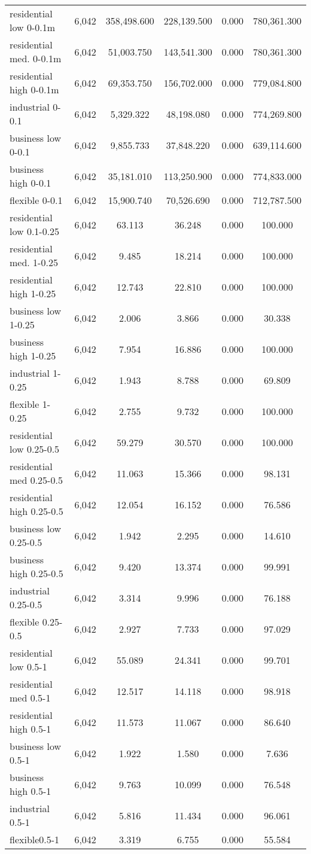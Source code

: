 \begin{table}[!htbp]
\begin{tabular}{@{\extracolsep{5pt}}lccccc}
residential low 0-0.1m & 6,042 & 358,498.600 & 228,139.500 & 0.000 & 780,361.300 \\ 
residential med. 0-0.1m& 6,042 & 51,003.750 & 143,541.300 & 0.000 & 780,361.300 \\ 
residential high 0-0.1m& 6,042 & 69,353.750 & 156,702.000 & 0.000 & 779,084.800 \\ 
industrial 0-0.1& 6,042 & 5,329.322 & 48,198.080 & 0.000 & 774,269.800 \\ 
business low 0-0.1& 6,042 & 9,855.733 & 37,848.220 & 0.000 & 639,114.600 \\ 
business high 0-0.1& 6,042 & 35,181.010 & 113,250.900 & 0.000 & 774,833.000 \\ 
flexible 0-0.1& 6,042 & 15,900.740 & 70,526.690 & 0.000 & 712,787.500 \\ 
residential low 0.1-0.25& 6,042 & 63.113 & 36.248 & 0.000 & 100.000 \\ 
residential med. 1-0.25& 6,042 & 9.485 & 18.214 & 0.000 & 100.000 \\ 
residential high 1-0.25& 6,042 & 12.743 & 22.810 & 0.000 & 100.000 \\ 
business low 1-0.25& 6,042 & 2.006 & 3.866 & 0.000 & 30.338 \\ 
business high 1-0.25& 6,042 & 7.954 & 16.886 & 0.000 & 100.000 \\ 
industrial  1-0.25& 6,042 & 1.943 & 8.788 & 0.000 & 69.809 \\ 
flexible 1-0.25& 6,042 & 2.755 & 9.732 & 0.000 & 100.000 \\ 
residential low 0.25-0.5 & 6,042 & 59.279 & 30.570 & 0.000 & 100.000 \\ 
residential med 0.25-0.5& 6,042 & 11.063 & 15.366 & 0.000 & 98.131 \\ 
residential high 0.25-0.5& 6,042 & 12.054 & 16.152 & 0.000 & 76.586 \\ 
business low 0.25-0.5& 6,042 & 1.942 & 2.295 & 0.000 & 14.610 \\ 
business high 0.25-0.5& 6,042 & 9.420 & 13.374 & 0.000 & 99.991 \\ 
industrial 0.25-0.5& 6,042 & 3.314 & 9.996 & 0.000 & 76.188 \\ 
flexible 0.25-0.5& 6,042 & 2.927 & 7.733 & 0.000 & 97.029 \\ 
residential low 0.5-1& 6,042 & 55.089 & 24.341 & 0.000 & 99.701 \\ 
residential med 0.5-1& 6,042 & 12.517 & 14.118 & 0.000 & 98.918 \\ 
residential high 0.5-1& 6,042 & 11.573 & 11.067 & 0.000 & 86.640 \\ 
business low 0.5-1& 6,042 & 1.922 & 1.580 & 0.000 & 7.636 \\ 
business high 0.5-1& 6,042 & 9.763 & 10.099 & 0.000 & 76.548 \\ 
industrial 0.5-1& 6,042 & 5.816 & 11.434 & 0.000 & 96.061 \\ 
flexible0.5-1& 6,042 & 3.319 & 6.755 & 0.000 & 55.584 \\ 



\end{tabular}
\end{table}

